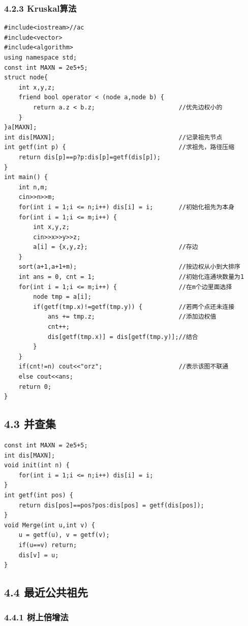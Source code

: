 \documentclass[11pt]{article}		%
\begin{document}
\subsubsection{4.2.3 Kruskal算法}\label{kruskalux7b97ux6cd5}

\begin{verbatim}
#include<iostream>//ac
#include<vector>
#include<algorithm>
using namespace std;
const int MAXN = 2e5+5;
struct node{
    int x,y,z;
    friend bool operator < (node a,node b) {
        return a.z < b.z;                       //优先边权小的
    }
}a[MAXN];
int dis[MAXN];                                  //记录祖先节点
int getf(int p) {                               //求祖先，路径压缩
    return dis[p]==p?p:dis[p]=getf(dis[p]);
}
int main() {
    int n,m;
    cin>>n>>m;
    for(int i = 1;i <= n;i++) dis[i] = i;       //初始化祖先为本身
    for(int i = 1;i <= m;i++) {
        int x,y,z;
        cin>>x>>y>>z;
        a[i] = {x,y,z};                         //存边
    }
    sort(a+1,a+1+m);                            //按边权从小到大排序
    int ans = 0, cnt = 1;                       //初始化连通块数量为1
    for(int i = 1;i <= m;i++) {                 //在m个边里面选择
        node tmp = a[i];
        if(getf(tmp.x)!=getf(tmp.y)) {          //若两个点还未连接
            ans += tmp.z;                       //添加边权值
            cnt++;
            dis[getf(tmp.x)] = dis[getf(tmp.y)];//结合
        }
    }
    if(cnt!=n) cout<<"orz";                     //表示该图不联通
    else cout<<ans;
    return 0;
}
\end{verbatim}

\subsection{4.3 并查集}\label{ux5e76ux67e5ux96c6}

\begin{verbatim}
const int MAXN = 2e5+5;
int dis[MAXN];
void init(int n) {
    for(int i = 1;i <= n;i++) dis[i] = i;
}
int getf(int pos) {
    return dis[pos]==pos?pos:dis[pos] = getf(dis[pos]);
}
void Merge(int u,int v) {
    u = getf(u), v = getf(v);
    if(u==v) return;
    dis[v] = u;
}
\end{verbatim}

\subsection{4.4
最近公共祖先}\label{ux6700ux8fd1ux516cux5171ux7956ux5148}

\subsubsection{4.4.1 树上倍增法}\label{ux6811ux4e0aux500dux589eux6cd5}
\end{document}
